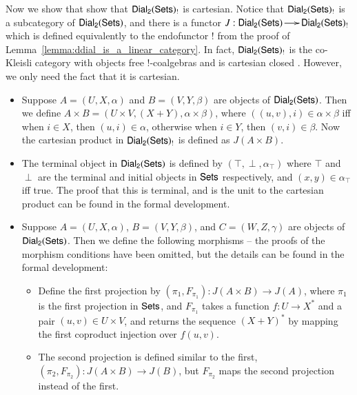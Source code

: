 \begin{report}
  Now we show that show that $\mathsf{Dial_2}(\mathsf{Sets})_!$ is cartesian.  Notice that
  $\mathsf{Dial_2}(\mathsf{Sets})_!$ is a subcategory of $\mathsf{Dial_2}(\mathsf{Sets})$, and there is a functor $J :
  \mathsf{Dial_2}(\mathsf{Sets}) \to \mathsf{Dial_2}(\mathsf{Sets})_!$ which is defined equivalently to the endofunctor
  $!$ from the proof of Lemma~\ref{lemma:ddial_is_a_linear_category}.
  In fact, $\mathsf{Dial_2}(\mathsf{Sets})_!$ is the co-Kleisli category with objects free
  !-coalgebras and is cartesian closed \cite{dePaiva:1987}.  However,
  we only need the fact that it is cartesian.
  \begin{itemize}
  \item Suppose $A = (U , X , \alpha)$ and $B = (V , Y , \beta)$ are
    objects of $\mathsf{Dial_2}(\mathsf{Sets})$. Then we define $A \times B = (U \times V, (X +
    Y), \alpha \times \beta)$, where $((u , v), i) \in \alpha \times
    \beta$ iff when $i \in X$, then $(u , i) \in \alpha$, otherwise
    when $i \in Y$, then $(v , i) \in \beta$.  Now the cartesian
    product in $\mathsf{Dial_2}(\mathsf{Sets})_!$ is defined as $J(A \times B)$.

  \item The terminal object in $\mathsf{Dial_2}(\mathsf{Sets})$ is defined by $(\top, \perp,
    \alpha_\top)$ where $\top$ and $\perp$ are the terminal and
    initial objects in $\mathsf{Sets}$ respectively, and $(x , y) \in
    \alpha_\top$ iff true. The proof that this is terminal, and is the
    unit to the cartesian product can be found in the formal
    development.
    
  \item Suppose $A = (U , X , \alpha)$, $B = (V , Y , \beta)$, and $C
    = (W , Z , \gamma)$ are objects of $\mathsf{Dial_2}(\mathsf{Sets})$.  Then we define
    the following morphisms -- the proofs of the morphism conditions
    have been omitted, but the details can be found in the formal
    development:
    \begin{itemize}
    \item Define the first projection by $(\pi_1, F_{\pi_1}) : J(A
      \times B) \to J(A)$, where $\pi_1$ is the first projection in
      $\mathsf{Sets}$, and $F_{\pi_1}$ takes a function $f : U \to X^*$ and a
      pair $(u , v) \in U \times V$, and returns the sequence $(X +
      Y)^*$ by mapping the first coproduct injection over $f(u ,v)$.

    \item The second projection is defined similar to the first,
      $(\pi_2, F_{\pi_2}) : J(A \times B) \to J(B)$, but $F_{\pi_2}$ maps
      the second projection instead of the first.


\end{itemize}
\end{itemize}
\end{report}

